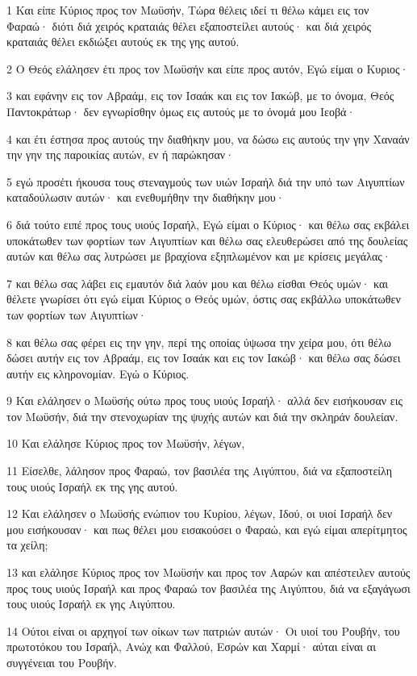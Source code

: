 \par 1 Και είπε Κύριος προς τον Μωϋσήν, Τώρα θέλεις ιδεί τι θέλω κάμει εις τον Φαραώ· διότι διά χειρός κραταιάς θέλει εξαποστείλει αυτούς· και διά χειρός κραταιάς θέλει εκδιώξει αυτούς εκ της γης αυτού.
\par 2 Ο Θεός ελάλησεν έτι προς τον Μωϋσήν και είπε προς αυτόν, Εγώ είμαι ο Κυριος·
\par 3 και εφάνην εις τον Αβραάμ, εις τον Ισαάκ και εις τον Ιακώβ, με το όνομα, Θεός Παντοκράτωρ· δεν εγνωρίσθην όμως εις αυτούς με το όνομά μου Ιεοβά·
\par 4 και έτι έστησα προς αυτούς την διαθήκην μου, να δώσω εις αυτούς την γην Χαναάν την γην της παροικίας αυτών, εν ή παρώκησαν·
\par 5 εγώ προσέτι ήκουσα τους στεναγμούς των υιών Ισραήλ διά την υπό των Αιγυπτίων καταδούλωσιν αυτών· και ενεθυμήθην την διαθήκην μου·
\par 6 διά τούτο ειπέ προς τους υιούς Ισραήλ, Εγώ είμαι ο Κύριος· και θέλω σας εκβάλει υποκάτωθεν των φορτίων των Αιγυπτίων και θέλω σας ελευθερώσει από της δουλείας αυτών και θέλω σας λυτρώσει με βραχίονα εξηπλωμένον και με κρίσεις μεγάλας·
\par 7 και θέλω σας λάβει εις εμαυτόν διά λαόν μου και θέλω είσθαι Θεός υμών· και θέλετε γνωρίσει ότι εγώ είμαι Κύριος ο Θεός υμών, όστις σας εκβάλλω υποκάτωθεν των φορτίων των Αιγυπτίων·
\par 8 και θέλω σας φέρει εις την γην, περί της οποίας ύψωσα την χείρα μου, ότι θέλω δώσει αυτήν εις τον Αβραάμ, εις τον Ισαάκ και εις τον Ιακώβ· και θέλω σας δώσει αυτήν εις κληρονομίαν. Εγώ ο Κύριος.
\par 9 Και ελάλησεν ο Μωϋσής ούτω προς τους υιούς Ισραήλ· αλλά δεν εισήκουσαν εις τον Μωϋσήν, διά την στενοχωρίαν της ψυχής αυτών και διά την σκληράν δουλείαν.
\par 10 Και ελάλησε Κύριος προς τον Μωϋσήν, λέγων,
\par 11 Είσελθε, λάλησον προς Φαραώ, τον βασιλέα της Αιγύπτου, διά να εξαποστείλη τους υιούς Ισραήλ εκ της γης αυτού.
\par 12 Και ελάλησεν ο Μωϋσής ενώπιον του Κυρίου, λέγων, Ιδού, οι υιοί Ισραήλ δεν μου εισήκουσαν· και πως θέλει μου εισακούσει ο Φαραώ, και εγώ είμαι απερίτμητος τα χείλη;
\par 13 και ελάλησε Κύριος προς τον Μωϋσήν και προς τον Ααρών και απέστειλεν αυτούς προς τους υιούς Ισραήλ και προς Φαραώ τον βασιλέα της Αιγύπτου, διά να εξαγάγωσι τους υιούς Ισραήλ εκ γης Αιγύπτου.
\par 14 Ούτοι είναι οι αρχηγοί των οίκων των πατριών αυτών· Οι υιοί του Ρουβήν, του πρωτοτόκου του Ισραήλ, Ανώχ και Φαλλού, Εσρών και Χαρμί· αύται είναι αι συγγένειαι του Ρουβήν.
